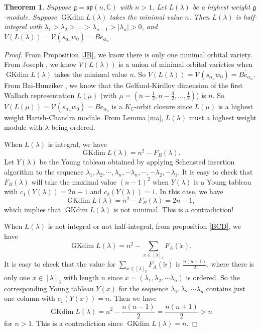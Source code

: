 \documentclass{amsart}[12pt]
\newtheorem{Thm}[Lem]{Theorem}
\newcommand{\gkd}{\operatorname{GKdim}}
\numberwithin{equation}{section}
\begin{document}
\begin{Thm}
		Suppose $\mathfrak{g}=\mathfrak{sp }(n, \mathbb{C})$ with $n>1$. Let $L(\lambda)$ be a highest weight $\mathfrak{g}$-module. Suppose $\gkd L(\lambda)$ takes the minimal value $n$. Then
	$L(\lambda)$ is  half-integral  with $\lambda_1>\lambda_2>...>\lambda_{n-1}>|\lambda_n|>0$,  and $V(L(\lambda))=\mathcal{V}(s_{\alpha_{n}}w_0)=\overline{Be_{\alpha_{n}}}$.

\end{Thm}

\begin{proof}
From Proposition \ref{JB}, we know there is only one minimal orbital variety. From Joseph \cite{Jo98}, we know $V(L(\lambda))$ is a union of minimal orbital varieties when  $\gkd L(\lambda)$ takes the minimal value $n$. So $V(L(\lambda))=\mathcal{V}(s_{\alpha_{n}}w_0)=\overline{Be_{\alpha_{n}}}$.
From Bai-Hunziker \cite{BH}, we know that the Gelfand-Kirillov dimension of the first Wallach representation $L(\mu)$ (with $\mu=(n-\frac{1}{2},n-\frac{3}{2},...,\frac{1}{2})$) is $n$.
So $V(L(\mu))=\mathcal{V}(s_{\alpha_{n}}w_0)=\overline{Be_{\alpha_{n}}}$ is a $K_{\mathbb{C}}$-orbit closure since $L(\mu)$ is a highest weight Harish-Chandra module.
From Lemma \ref{ma}, $L(\lambda)$ must a highest weight  module with $\lambda$ being ordered. 


When $L(\lambda)$ is integral,  we have
\[
\gkd L(\lambda)=n^2-F_B(\lambda).
\]
Let $ Y(\lambda) $ be the  Young tableau obtained by applying Schensted insertion algorithm to the sequence \(
\lambda_1,\lambda_2,\cdots,\lambda_n,-\lambda_n,\cdots,-\lambda_2,-\lambda_1.\)	
It is easy to check that $F_B(\lambda)$  will take the maximal value $(n-1)^2$ when $ Y(\lambda) $ is a Young tableau with $c_1(Y(\lambda))=2n-1$ and  $c_2(Y(\lambda))=1$. In this case, we have \[
\gkd L(\lambda)=n^2-F_B(\lambda)=2n-1,
\]
which implies that $\gkd L(\lambda)$ is not minimal. This is a contradiction!




When $L(\lambda)$ is not integral or not half-integral, from proposition \ref{BCD}, we have 	\[
\gkd L(\lambda)=	n^2-\sum _{x\in [\lambda]_3} F_A(\tilde{x}).
\]
It is easy to check that the value for $\sum\limits_{x\in [\lambda]_3} F_A(\tilde{x})$ is $\frac{n(n-1)}{2}$, where there is only one $x \in [\lambda]_3$ with length $n$ since $ x=(\lambda_{1}, \lambda_{2},\cdots \lambda_{{n}})$ is ordered. So the corresponding Young tableau $Y(x)$ for the sequence $\lambda_{1}, \lambda_{2},\cdots \lambda_{{n}}$ contains just one column with
$c_1(Y(x))=n$.
Then we have
$$
\gkd L(\lambda)=n^2-\frac{n(n-1)}{2}=\frac{n(n+1)}{2}>n
$$ for $n>1$.
This is a contradiction since  $\gkd L(\lambda)=n$.










\end{proof}
\end{document}
